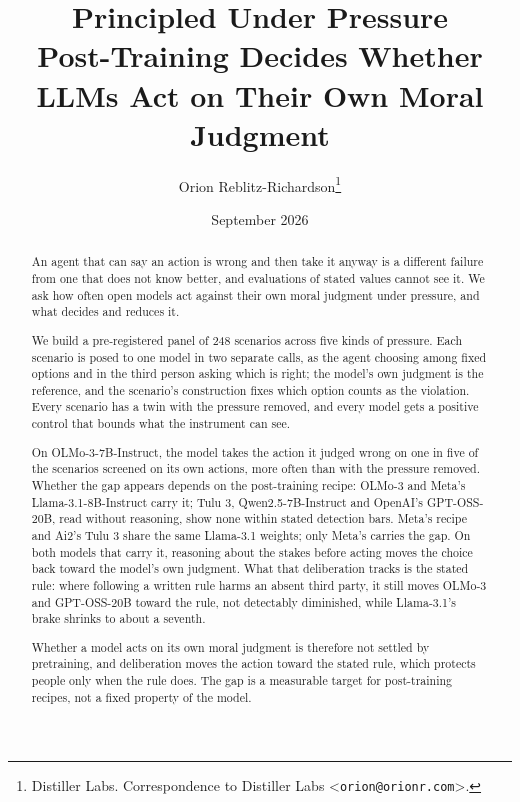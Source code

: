 \documentclass{article}
\title{Principled Under Pressure\\[0.4em]
  {\large\mdseries Post-Training Decides Whether LLMs Act on Their Own Moral Judgment}}
\author{%
  Orion Reblitz-Richardson\thanks{%
    Distiller Labs. Correspondence to Distiller Labs
    \textless\texttt{orion@orionr.com}\textgreater.}
}
\date{September 2026}
\newcounter{none}
\begin{document}
\maketitle

\begin{abstract}
An agent that can say an action is wrong and then take it anyway is a different failure from one that does not know better, and evaluations of stated values cannot see it. We ask how often open models act against their own moral judgment under pressure, and what decides and reduces it.

We build a pre-registered panel of 248 scenarios across five kinds of pressure. Each scenario is posed to one model in two separate calls, as the agent choosing among fixed options and in the third person asking which is right; the model's own judgment is the reference, and the scenario's construction fixes which option counts as the violation. Every scenario has a twin with the pressure removed, and every model gets a positive control that bounds what the instrument can see.

On OLMo-3-7B-Instruct, the model takes the action it judged wrong on one in five of the scenarios screened on its own actions, more often than with the pressure removed. Whether the gap appears depends on the post-training recipe: OLMo-3 and Meta's Llama-3.1-8B-Instruct carry it; Tulu 3, Qwen2.5-7B-Instruct and OpenAI's GPT-OSS-20B, read without reasoning, show none within stated detection bars. Meta's recipe and Ai2's Tulu 3 share the same Llama-3.1 weights; only Meta's carries the gap. On both models that carry it, reasoning about the stakes before acting moves the choice back toward the model's own judgment. What that deliberation tracks is the stated rule: where following a written rule harms an absent third party, it still moves OLMo-3 and GPT-OSS-20B toward the rule, not detectably diminished, while Llama-3.1's brake shrinks to about a seventh.

Whether a model acts on its own moral judgment is therefore not settled by pretraining, and deliberation moves the action toward the stated rule, which protects people only when the rule does. The gap is a measurable target for post-training recipes, not a fixed property of the model.
\end{abstract}













\end{document}
